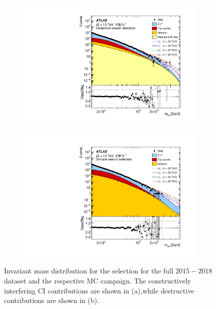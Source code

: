 \begin{figure}[]
    \centering
    \begin{subfigure}[b]{0.49\textwidth}
        \centering
        \includegraphics[width=\textwidth]{figures/analysis/datamc/dataMCcompare/const_ee_m_eebins_log100.pdf}
        \caption{}
        \label{fig:datamc:eeconst}
    \end{subfigure}
    \begin{subfigure}[b]{0.49\textwidth}
        \centering
        \includegraphics[width=\textwidth]{figures/analysis/datamc/dataMCcompare/const_uu_m_uubins_log100.pdf}
        \caption{}
        \label{fig:datamc:eedest}
    \end{subfigure}
    \caption[Invariant mass distributions for \ee channel]{Invariant mass distribution for the \ee selection for the full $2015-2018$ dataset and the respective MC campaign. The constructively interfering CI contributions are shown in (a),while destructive contributions are shown in (b).}
    \label{fig:datamc:eecompare}
\end{figure}

